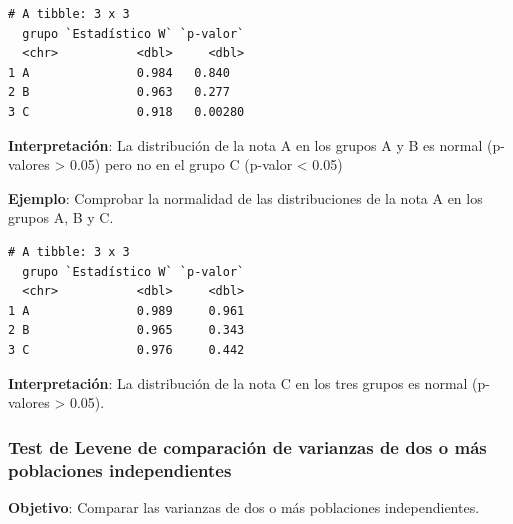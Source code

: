 \documentclass[
  a4paper,
]{scrreport}
\newenvironment{Shaded}{\begin{snugshade}}{\end{snugshade}}
\newcommand{\AttributeTok}[1]{\textcolor[rgb]{0.40,0.45,0.13}{#1}}
\newcommand{\FunctionTok}[1]{\textcolor[rgb]{0.28,0.35,0.67}{#1}}
\newcommand{\NormalTok}[1]{\textcolor[rgb]{0.00,0.23,0.31}{#1}}
\newcommand{\OtherTok}[1]{\textcolor[rgb]{0.00,0.23,0.31}{#1}}
\newcommand{\SpecialCharTok}[1]{\textcolor[rgb]{0.37,0.37,0.37}{#1}}
\newcommand{\StringTok}[1]{\textcolor[rgb]{0.13,0.47,0.30}{#1}}
\theoremstyle{definition}
\theoremstyle{definition}
\theoremstyle{remark}
\begin{document}
\begin{verbatim}
# A tibble: 3 x 3
  grupo `Estadístico W` `p-valor`
  <chr>           <dbl>     <dbl>
1 A               0.984   0.840  
2 B               0.963   0.277  
3 C               0.918   0.00280
\end{verbatim}

\textbf{Interpretación}: La distribución de la nota A en los grupos A y
B es normal (p-valores \textgreater{} 0.05) pero no en el grupo C
(p-valor \textless{} 0.05)

\textbf{Ejemplo}: Comprobar la normalidad de las distribuciones de la
nota A en los grupos A, B y C.

\begin{Shaded}
\end{Shaded}

\begin{verbatim}
# A tibble: 3 x 3
  grupo `Estadístico W` `p-valor`
  <chr>           <dbl>     <dbl>
1 A               0.989     0.961
2 B               0.965     0.343
3 C               0.976     0.442
\end{verbatim}

\textbf{Interpretación}: La distribución de la nota C en los tres grupos
es normal (p-valores \textgreater{} 0.05).

\hypertarget{test-de-levene-de-comparaciuxf3n-de-varianzas-de-dos-o-muxe1s-poblaciones-independientes}{%
\subsubsection{Test de Levene de comparación de varianzas de dos o más
poblaciones
independientes}\label{test-de-levene-de-comparaciuxf3n-de-varianzas-de-dos-o-muxe1s-poblaciones-independientes}}

\textbf{Objetivo}: Comparar las varianzas de dos o más poblaciones
independientes.
\end{document}
